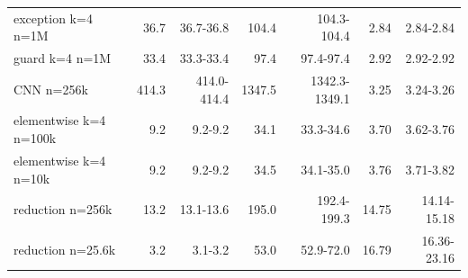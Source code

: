 \begin{tabular}{lrrrrrr}
exception k=4 n=1M & 36.7 & 36.7-36.8 & 104.4 & 104.3-104.4 & 2.84 & 2.84-2.84 \\
guard k=4 n=1M & 33.4 & 33.3-33.4 & 97.4 & 97.4-97.4 & 2.92 & 2.92-2.92 \\
CNN n=256k & 414.3 & 414.0-414.4 & 1347.5 & 1342.3-1349.1 & 3.25 & 3.24-3.26 \\
elementwise k=4 n=100k & 9.2 & 9.2-9.2 & 34.1 & 33.3-34.6 & 3.70 & 3.62-3.76 \\
elementwise k=4 n=10k & 9.2 & 9.2-9.2 & 34.5 & 34.1-35.0 & 3.76 & 3.71-3.82 \\
reduction n=256k & 13.2 & 13.1-13.6 & 195.0 & 192.4-199.3 & 14.75 & 14.14-15.18 \\
reduction n=25.6k & 3.2 & 3.1-3.2 & 53.0 & 52.9-72.0 & 16.79 & 16.36-23.16 \\
\bottomrule
\end{tabular}
